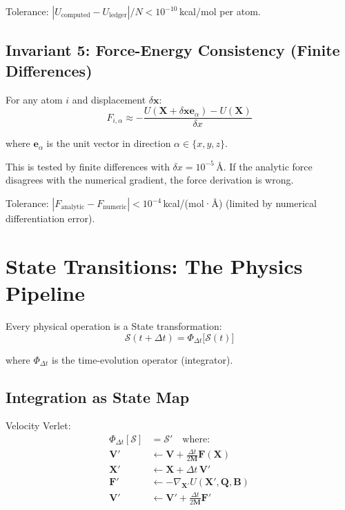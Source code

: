 \documentclass[11pt]{article}
\begin{document}
Tolerance: $|U_{\text{computed}} - U_{\text{ledger}}| / N < 10^{-10}$\,kcal/mol per atom.

\subsection{Invariant 5: Force-Energy Consistency (Finite Differences)}

For any atom $i$ and displacement $\delta \mathbf{x}$:
\begin{equation}
F_{i,\alpha} \approx -\frac{U(\mathbf{X} + \delta \mathbf{x} \mathbf{e}_\alpha) - U(\mathbf{X})}{\delta x}
\end{equation}

where $\mathbf{e}_\alpha$ is the unit vector in direction $\alpha \in \{x,y,z\}$.

This is tested by finite differences with $\delta x = 10^{-5}$\,\AA. If the analytic force disagrees with the numerical gradient, the force derivation is wrong.

Tolerance: $|F_{\text{analytic}} - F_{\text{numeric}}| < 10^{-4}$\,kcal/(mol·\AA) (limited by numerical differentiation error).

\section{State Transitions: The Physics Pipeline}

Every physical operation is a State transformation:
\begin{equation}
\mathcal{S}(t+\Delta t) = \Phi_{\Delta t}\bigl[\mathcal{S}(t)\bigr]
\end{equation}

where $\Phi_{\Delta t}$ is the time-evolution operator (integrator).

\subsection{Integration as State Map}

Velocity Verlet:
\begin{align}
\Phi_{\Delta t}[\mathcal{S}] &= \mathcal{S}' \quad \text{where:} \\
\mathbf{V}' &\gets \mathbf{V} + \frac{\Delta t}{2\mathbf{M}} \mathbf{F}(\mathbf{X}) \\
\mathbf{X}' &\gets \mathbf{X} + \Delta t \, \mathbf{V}' \\
\mathbf{F}' &\gets -\nabla_{\mathbf{X}'} U(\mathbf{X}', \mathbf{Q}, \mathbf{B}) \\
\mathbf{V}' &\gets \mathbf{V}' + \frac{\Delta t}{2\mathbf{M}} \mathbf{F}'
\end{align}
\end{document}
